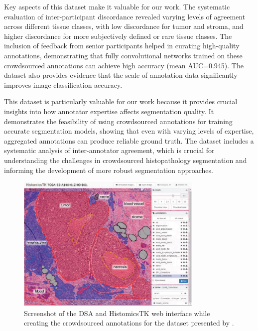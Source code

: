 Key aspects of this dataset make it valuable for our work. The
systematic evaluation of inter-participant discordance revealed
varying levels of agreement across different tissue classes, with low
discordance for tumor and stroma, and higher discordance for more
subjectively defined or rare tissue classes. The inclusion of
feedback from senior participants helped in curating high-quality
annotations, demonstrating that fully convolutional networks trained
on these crowdsourced annotations can achieve high accuracy (mean
AUC=0.945). The dataset also provides evidence that the scale of
annotation data significantly improves image classification accuracy.

This dataset is particularly valuable for our work because it
provides crucial insights into how annotator expertise affects
segmentation quality. It demonstrates the feasibility of using
crowdsourced annotations for training accurate segmentation models,
showing that even with varying levels of expertise, aggregated
annotations can produce reliable ground truth. The dataset includes a
systematic analysis of inter-annotator agreement, which is crucial
for understanding the challenges in crowdsourced histopathology
segmentation and informing the development of more robust
segmentation approaches.

\begin{figure}[h]
  \centering
  \includegraphics[width=0.8\textwidth]{Cap2/Figures/amgad_histomics_tk.png}
  \caption{Screenshot of the DSA and HistomicsTK web interface while
    creating the crowdsourced annotations for the dataset presented by
  \cite{AmgadEtAl2019}.}
  \label{fig:amgad_histomics_tk}
\end{figure}
